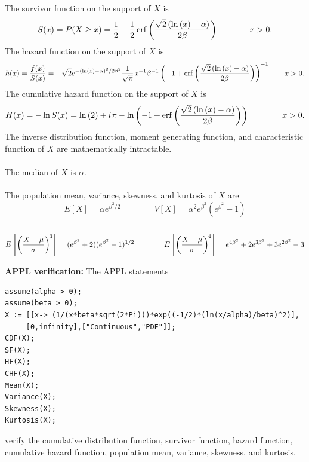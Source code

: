 \documentclass[12pt,fullpage]{article}
\begin{document}
The survivor function on the support of $X$ is
$$
S(x) = P(X \ge x) = \frac{1} {2} - \frac{1} {2}\,
{{\rm erf}\left({\frac {\sqrt {2} \left( \ln  \left( x \right) - \alpha  \right) }{2\beta }}\right)}\qquad \qquad
x > 0.
$$
The hazard function on the support of $X$ is
$$
h(x) = \frac{f(x)}{S(x)} = -\sqrt {2}{e^{- \left( \ln  \left( x \right) -
\alpha  \right) ^ {2}/ {2\beta }^{2}}}{\frac {1}{\sqrt {\pi }}}\kern 0.08 em {x}^{-1
}{\beta }^{-1} \left( -1+
{{\rm erf}\left({\frac {\sqrt {2} \left( \ln  \left( x \right) -\alpha  \right) }{2\beta }}\right)}
 \right) ^{-1}
 \qquad x > 0.
$$
The cumulative hazard function on the support of $X$ is
$$
H(x) = - \ln S(x) =\ln  \left( 2 \right) +i \kern 0.08 em \pi -\ln  \left( -1+
{{\rm erf}\left({\frac {\sqrt {2} \left( \ln  \left( x \right) -\alpha  \right) }{2\beta }}\right)}
 \right) \qquad \qquad x > 0.
$$
The inverse distribution function, moment generating function, and characteristic function of $X$ are mathematically intractable.\\
\\
The median of $X$ is $\alpha.$\\
\\
The population mean, variance, skewness, and kurtosis of $X$ are
$$
E[X] = \alpha e^{\beta^2/2} \qquad \qquad 
V[X] = \alpha^2 e^{\beta^2} (e^{\beta^2} - 1)
$$
\\
\vspace{-.35in}
$$
E\left[ \left( \frac{X - \mu}{\sigma} \right) ^ {\kern -0.08 em 3} \right] = (e^{\beta^2} + 2)(e^{\beta^2} - 1)^{1/2} \qquad \qquad
E\left[ \left( \frac{X - \mu}{\sigma} \right) ^ {\kern -0.08 em 4} \right] = e^{4 \beta^2} + 2 e^{3 \beta^2} + 3 e^{2 \beta^2} - 3
$$
\vspace{0.1in}

\noindent
{\bf APPL verification:}
The APPL statements
\begin{verbatim}
assume(alpha > 0);
assume(beta > 0);
X := [[x-> (1/(x*beta*sqrt(2*Pi)))*exp((-1/2)*(ln(x/alpha)/beta)^2)],
     [0,infinity],["Continuous","PDF"]];
CDF(X);
SF(X);
HF(X);
CHF(X);
Mean(X);
Variance(X);
Skewness(X);
Kurtosis(X);
\end{verbatim}
verify the cumulative distribution function, survivor function, hazard function, cumulative hazard function, population mean, variance, skewness, and kurtosis.
\end{document}

